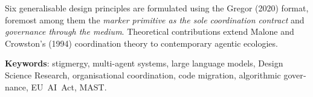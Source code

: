 \begin{otherlanguage}{english}
Six generalisable design principles are formulated using the Gregor
(2020) format, foremost among them the \emph{marker primitive as the
sole coordination contract} and \emph{governance through the medium}.
Theoretical contributions extend Malone and Crowston's (1994)
coordination theory to contemporary agentic ecologies.

\vspace{0.3cm}
\noindent\textbf{Keywords}: stigmergy, multi-agent systems, large
language models, Design Science Research, organisational
coordination, code migration, algorithmic governance, EU~AI~Act,
MAST.
\end{otherlanguage}

\cleardoublepage
